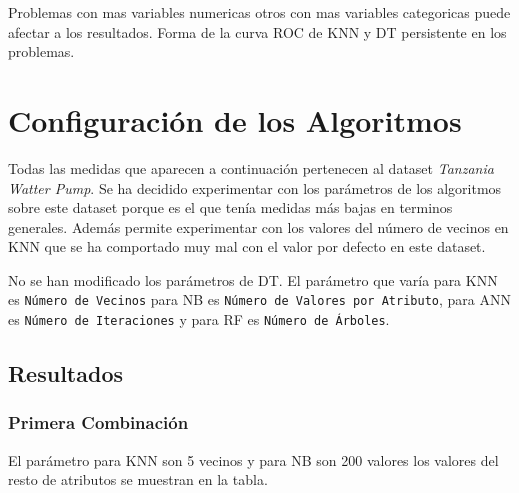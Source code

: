 \documentclass[..]{subfiles}
\begin{document}
Problemas con mas variables numericas otros con mas variables categoricas puede afectar a los resultados.
Forma de la curva ROC de KNN y DT persistente en los problemas.




\section{Configuración de los Algoritmos}

Todas las medidas que aparecen a continuación pertenecen al dataset \textit{Tanzania Watter Pump}. Se ha decidido experimentar con los parámetros de los algoritmos sobre este dataset porque es el que tenía medidas más bajas en terminos generales. Además permite experimentar con los valores del número de vecinos en KNN que se ha comportado muy mal con el valor por defecto en este dataset. 

No se han modificado los parámetros de DT. El parámetro que varía para KNN es \texttt{Número de Vecinos} para NB es \texttt{Número de Valores por Atributo}, para ANN es \texttt{Número de Iteraciones} y para RF es \texttt{Número de Árboles}.


\clearpage
\subsection{Resultados}

\subsubsection{Primera Combinación}
El parámetro para KNN son 5 vecinos y para NB son 200 valores los valores del resto de atributos se muestran en la tabla.

\begin{figure}[h!]
	\centering
	
\end{figure}

\vspace{1.0em}
\end{document}
